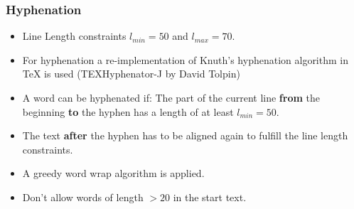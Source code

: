 \documentclass{beamer}
\begin{document}
\begin{frame}
\frametitle{Hyphenation}


\begin{itemize}
\item Line Length constraints $l_{min}=50$ and $l_{max}=70.$



\item For hyphenation a re-implementation of Knuth's hyphenation algorithm in
TeX is used (TEXHyphenator-J by David Tolpin) 

\item A word can be hyphenated if: The part of the current line \textbf{from} the beginning \textbf{to} the hyphen has a length of at least $l_{min}=50.$

\item The text \textbf{after} the hyphen has to be aligned again to fulfill the line length
constraints.



\item A greedy word wrap algorithm is applied. 

\item Don't allow words of length $>20$ in the start text.
\end{itemize}

\end{frame}
\end{document}
